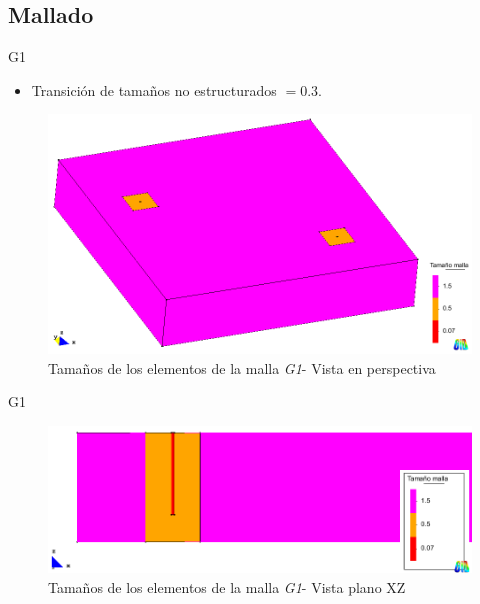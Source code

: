 \documentclass[spanish]{beamer}
\begin{document}
\subsection{Mallado}
\begin{frame}{G1}\begin{center}
\begin{itemize}
\item Transición de tamaños no estructurados $=0.3$.
\end{itemize}
\begin{figure}[tbhp]
\centerline{\includegraphics[scale=0.21]{../img/100m/100_perspec_tam_malla}}
\caption{Tamaños de los elementos de la malla \emph{G1}- Vista en perspectiva}
\label{100_perspec_tam_malla}
\end{figure}
\end{center}\end{frame}
%
\begin{frame}{G1}\begin{center}
\begin{figure}[tbhp]
\centerline{\includegraphics[scale=0.23]{../img/100m/100_xz_tam_malla}}
\caption{Tamaños de los elementos de la malla \emph{G1}- Vista plano XZ}
\label{100_xz_tam_malla}
\end{figure}
\end{center}\end{frame}
\end{document}

